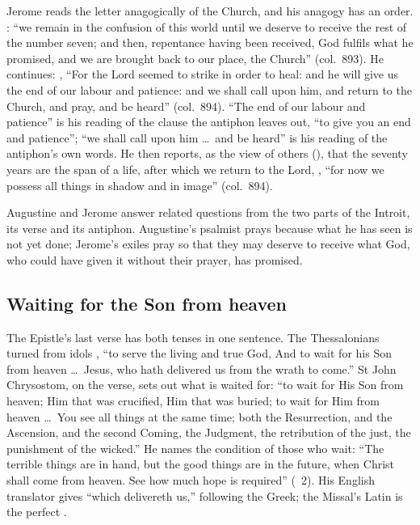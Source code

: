 Jerome reads the letter anagogically of the Church, and his anagogy has an
order. : ``we remain in the confusion of
this world until we deserve to receive the rest of the number seven; and then,
repentance having been received, God fulfils what he promised, and we are
brought back to our place, the Church'' (col.~893). He continues:
, ``For the Lord seemed to strike in order to heal: and he will
give us the end of our labour and patience: and we shall call upon him, and
return to the Church, and pray, and be heard'' (col.~894). ``The end of our
labour and patience'' is his reading of the clause the antiphon leaves out,
``to give you an end and patience''; ``we shall call upon him \dots\ and be
heard'' is his reading of the antiphon's own words. He then reports, as the
view of others (), that the seventy years are the span of a
life, after which we return to the Lord, , ``for now we possess all things in shadow and in
image'' (col.~894).

Augustine and Jerome answer related questions from the two parts of the
Introit, its verse and its antiphon. Augustine's psalmist prays because what
he has seen is not yet done; Jerome's exiles pray so that they may deserve to
receive what God, who could have given it without their prayer, has promised.

\subsection{Waiting for the Son from heaven}
\label{sec:awaited-epistle}

The Epistle's last verse has both tenses in one sentence. The Thessalonians
turned from idols , ``to serve the living and true God, And to wait for his Son from
heaven \dots\ Jesus, who hath delivered us from the wrath to come.'' St John
Chrysostom, on the verse, sets out what is waited for: ``to wait for
His Son from heaven; Him that was crucified, Him that was buried; to wait for
Him from heaven \dots\ You see all things at the same time; both the
Resurrection, and the Ascension, and the second Coming, the Judgment, the
retribution of the just, the punishment of the wicked.'' He names the
condition of those who wait: ``The terrible things are in hand, but the good
things are in the future, when Christ shall come from heaven. See how much
hope is required'' (~2). His English translator gives
``which delivereth us,'' following the Greek; the Missal's Latin is the
perfect .

